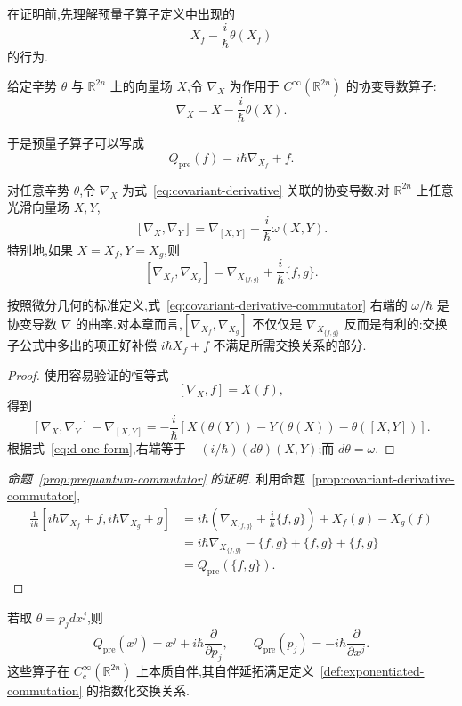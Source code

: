 在证明前,先理解预量子算子定义中出现的
\[
 X_f-\frac{i}{\hbar}\theta(X_f)
\]
的行为.

\begin{definition}[协变导数]\label{def:prequantum-covariant-derivative}
给定辛势 $\theta$ 与 $\mathbb R^{2n}$ 上的向量场 $X$,令 $\nabla_X$ 为作用于 $C^\infty(\mathbb R^{2n})$ 的协变导数算子:
\[
 \nabla_X=X-\frac{i}{\hbar}\theta(X).\label{eq:covariant-derivative}
\]
\end{definition}

于是预量子算子可以写成
\[
 Q_{\mathrm{pre}}(f)=i\hbar\nabla_{X_f}+f.
\]

\begin{proposition}[协变导数的交换子]\label{prop:covariant-derivative-commutator}
对任意辛势 $\theta$,令 $\nabla_X$ 为式~\eqref{eq:covariant-derivative} 关联的协变导数.对 $\mathbb R^{2n}$ 上任意光滑向量场 $X,Y$,
\[
 [\nabla_X,\nabla_Y]
 =\nabla_{[X,Y]}-\frac{i}{\hbar}\omega(X,Y).\label{eq:covariant-derivative-commutator}
\]
特别地,如果 $X=X_f,Y=X_g$,则
\[
 [\nabla_{X_f},\nabla_{X_g}]
 =\nabla_{X_{\{f,g\}}}+\frac{i}{\hbar}\{f,g\}.
\]
\end{proposition}

按照微分几何的标准定义,式~\eqref{eq:covariant-derivative-commutator} 右端的 $\omega/\hbar$ 是协变导数 $\nabla$ 的曲率.对本章而言,$[\nabla_{X_f},\nabla_{X_g}]$ 不仅仅是 $\nabla_{X_{\{f,g\}}}$ 反而是有利的:交换子公式中多出的项正好补偿 $i\hbar X_f+f$ 不满足所需交换关系的部分.

\begin{proof}
使用容易验证的恒等式
\[
 [\nabla_X,f]=X(f),
\]
得到
\[
 [\nabla_X,\nabla_Y]-\nabla_{[X,Y]}
 =-\frac{i}{\hbar}
 [X(\theta(Y))-Y(\theta(X))-\theta([X,Y])].
\]
根据式~\eqref{eq:d-one-form},右端等于 $-(i/\hbar)(d\theta)(X,Y)$;而 $d\theta=\omega$.
\end{proof}

\begin{proof}[命题~\ref{prop:prequantum-commutator} 的证明]
利用命题~\ref{prop:covariant-derivative-commutator},
\[
\begin{aligned}
 \frac1{i\hbar}[i\hbar\nabla_{X_f}+f,i\hbar\nabla_{X_g}+g]
 &=i\hbar\left(\nabla_{X_{\{f,g\}}}
 +\frac{i}{\hbar}\{f,g\}\right)
 +X_f(g)-X_g(f)\\
 &=i\hbar\nabla_{X_{\{f,g\}}}
 -\{f,g\}+\{f,g\}+\{f,g\}\\
 &=Q_{\mathrm{pre}}(\{f,g\}).
\end{aligned}
\]
\end{proof}

\begin{example}[预量子位置与动量算子]\label{ex:prequantum-position-momentum}
若取 $\theta=p_jdx^j$,则
\[
 Q_{\mathrm{pre}}(x^j)=x^j+i\hbar\frac{\partial}{\partial p_j},
\qquad
 Q_{\mathrm{pre}}(p_j)=-i\hbar\frac{\partial}{\partial x^j}.
\]
这些算子在 $C_c^\infty(\mathbb R^{2n})$ 上本质自伴,其自伴延拓满足定义~\ref{def:exponentiated-commutation} 的指数化交换关系.
\end{example}

